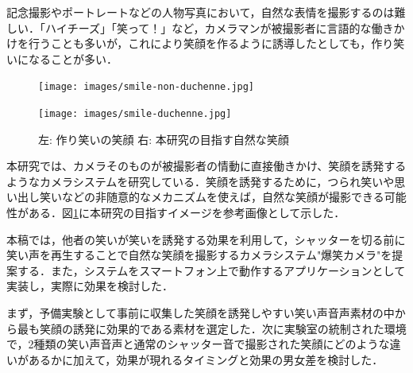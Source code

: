 \documentclass[submit,techreq]{ec2014}
\begin{document}
記念撮影やポートレートなどの人物写真において，自然な表情を撮影するのは難しい．「ハイチーズ」「笑って！」など，カメラマンが被撮影者に言語的な働きかけを行うことも多いが，これにより笑顔を作るように誘導したとしても，作り笑いになることが多い．


\begin{figure}[b!]
\begin{minipage}{0.49\columnwidth}
\begin{center}
\texttt{[image: images/smile-non-duchenne.jpg]}
\end{center}
\end{minipage}
\begin{minipage}{0.49\columnwidth}
\begin{center}
\texttt{[image: images/smile-duchenne.jpg]}
\end{center}
\end{minipage}
\label{hirashimasmile}
\begin{center}
\caption{左: 作り笑いの笑顔 右: 本研究の目指す自然な笑顔}

\end{center}
\end{figure}


本研究では、カメラそのものが被撮影者の情動に直接働きかけ、笑顔を誘発するようなカメラシステムを研究している．笑顔を誘発するために，つられ笑いや思い出し笑いなどの非随意的なメカニズムを使えば，自然な笑顔が撮影できる可能性がある．図\ref{hirashimasmile}に本研究の目指すイメージを参考画像として示した．

本稿では，他者の笑いが笑いを誘発する効果を利用して，シャッターを切る前に笑い声を再生することで自然な笑顔を撮影するカメラシステム"爆笑カメラ"を提案する．また，システムをスマートフォン上で動作するアプリケーションとして実装し，実際に効果を検討した．

まず，予備実験として事前に収集した笑顔を誘発しやすい笑い声音声素材の中から最も笑顔の誘発に効果的である素材を選定した．次に実験室の統制された環境で，2種類の笑い声音声と通常のシャッター音で撮影された笑顔にどのような違いがあるかに加えて，効果が現れるタイミングと効果の男女差を検討した．
\end{document}
